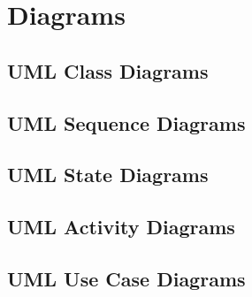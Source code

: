 \section{Diagrams}

\subsection*{UML Class Diagrams}

\subsection*{UML Sequence Diagrams}

\subsection*{UML State Diagrams}

\subsection*{UML Activity Diagrams}

\subsection*{UML Use Case Diagrams}

